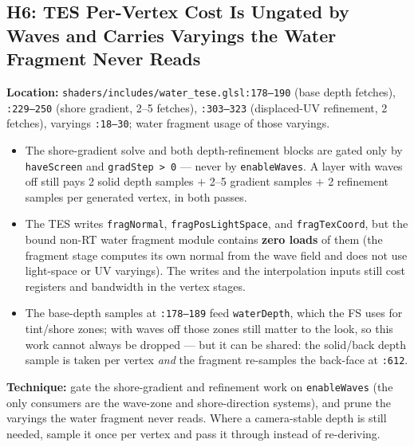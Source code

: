 \documentclass[11pt,a4paper]{article}
\begin{document}
\subsection{H6: TES Per-Vertex Cost Is Ungated by Waves and Carries Varyings the Water Fragment Never Reads}

\textbf{Location:} \texttt{shaders/includes/water\_tese.glsl:178--190} (base depth fetches), \texttt{:229--250} (shore gradient, 2--5 fetches), \texttt{:303--323}
(displaced-UV refinement, 2 fetches), varyings \texttt{:18--30}; water fragment usage of those varyings.

\begin{itemize}
    \item The shore-gradient solve and both depth-refinement blocks are gated only by \texttt{haveScreen} and \texttt{gradStep > 0} --- never by \texttt{enableWaves}. A layer
    with waves off still pays 2 solid depth samples $+$ 2--5 gradient samples $+$ 2 refinement samples per generated vertex, in both passes.
    \item The TES writes \texttt{fragNormal}, \texttt{fragPosLightSpace}, and \texttt{fragTexCoord}, but the bound non-RT water fragment module contains \textbf{zero loads} of
    them (the fragment stage computes its own normal from the wave field and does not use light-space or UV varyings). The writes and the interpolation inputs still cost
    registers and bandwidth in the vertex stages.
    \item The base-depth samples at \texttt{:178--189} feed \texttt{waterDepth}, which the FS uses for tint/shore zones; with waves off those zones still matter to the look, so this
    work cannot always be dropped --- but it can be shared: the solid/back depth sample is taken per vertex \emph{and} the fragment re-samples the back-face at \texttt{:612}.
\end{itemize}

\textbf{Technique:} gate the shore-gradient and refinement work on \texttt{enableWaves} (the only consumers are the wave-zone and shore-direction systems), and prune the
varyings the water fragment never reads. Where a camera-stable depth is still needed, sample it once per vertex and pass it through instead of re-deriving.
\end{document}

